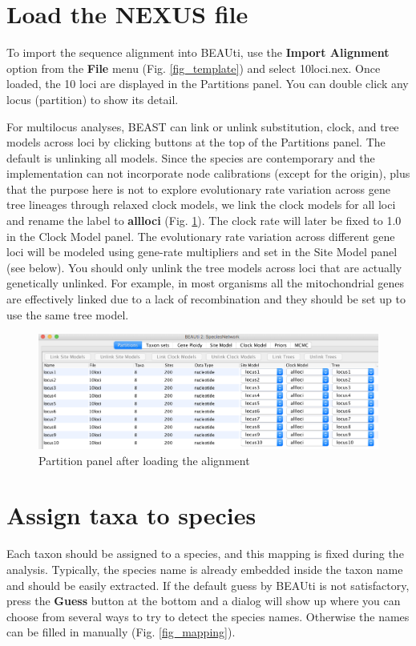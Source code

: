 \documentclass[11pt]{article}
\begin{document}
\section*{Load the NEXUS file}

To import the sequence alignment into BEAUti, use the {\bf Import Alignment} option from the {\bf File} menu (Fig. \ref{fig_template}) and select 10loci.nex. Once loaded, the 10 loci are displayed in the Partitions panel. You can double click any locus (partition) to show its detail.

For multilocus analyses, BEAST can link or unlink substitution, clock, and tree models across loci by clicking buttons at the top of the Partitions panel. The default is unlinking all models.
Since the species are contemporary and the implementation can not incorporate node calibrations (except for the origin), plus that the purpose here is not to explore evolutionary rate variation across gene tree lineages through relaxed clock models, we link the clock models for all loci and rename the label to {\bf allloci} (Fig. \ref{fig_partition}). The clock rate will later be fixed to 1.0 in the Clock Model panel. The evolutionary rate variation across different gene loci will be modeled using gene-rate multipliers and set in the Site Model panel (see below).
You should only unlink the tree models across loci that are actually genetically unlinked. For example, in most organisms all the mitochondrial genes are effectively linked due to a lack of recombination and they should be set up to use the same tree model.

\begin{figure}[h]
\center
\includegraphics[width=1.0\textwidth]{figs/fig3_partition}
\caption{Partition panel after loading the alignment}
\label{fig_partition}
\end{figure}

\section*{Assign taxa to species}
Each taxon should be assigned to a species, and this mapping is fixed during the analysis. Typically, the species name is already embedded inside the taxon name and should be easily extracted. If the default guess by BEAUti is not satisfactory, press the {\bf Guess} button at the bottom and a dialog will show up where you can choose from several ways to try to detect the species names. Otherwise the names can be filled in manually (Fig. \ref{fig_mapping}).
\end{document}
